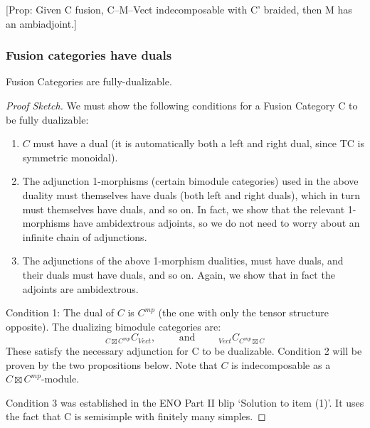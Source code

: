 \documentclass{amsart}
\begin{document}
	[Prop: Given C fusion, C--M--Vect indecomposable with C' braided, then M has an ambiadjoint.]

\subsubsection{Fusion categories have duals}

\begin{theorem}
	Fusion Categories are fully-dualizable. 
\end{theorem}
	
\begin{proof}[Proof Sketch]
We must show the following conditions for a Fusion Category C to be fully dualizable: 
	\begin{enumerate}
		\item $C$ must have a dual (it is automatically both a left and right dual, since TC is symmetric monoidal).
		\item The adjunction 1-morphisms (certain bimodule categories) used in the above duality must themselves have duals (both left and right duals), which in turn must themselves have duals, and so on.  In fact, we show that the relevant 1-morphisms have ambidextrous adjoints, so we do not need to worry about an infinite chain of adjunctions.
		\item The adjunctions of the above 1-morphism dualities, must have duals, and their duals must have duals, and so on.  Again, we show that in fact the adjoints are ambidextrous.
	\end{enumerate}

Condition 1: The dual of $C$ is $C^{mp}$ (the one with only the tensor structure opposite). The dualizing bimodule categories are:
\begin{equation*}
	{}_{C \boxtimes C^{mp}} C_{Vect}, \qquad \text{ and } \qquad {}_{Vect} C_{C^{mp} \boxtimes C}	
\end{equation*} 
These satisfy the necessary adjunction for C to be dualizable. 
Condition 2 will be proven by the two propositions below. Note that $C$ is indecomposable as a $C \boxtimes C^{mp}$-module.  
	
Condition 3 was established in the ENO Part II blip `Solution to item (1)'.  It uses the fact that C is semisimple with finitely many simples. 	
	
\end{proof}	
	
\end{document}
